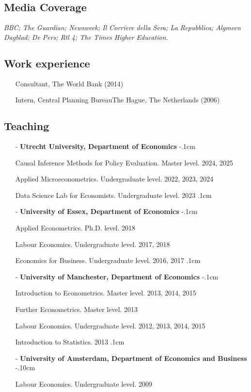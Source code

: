 \documentclass[11pt]{article}
\begin{document}
\subsection*{\sc Media Coverage}
{\emph{BBC; The Guardian; Newsweek; Il Corriere della Sera; La Repubblica; Algmeen Dagblad; De Pers; Rtl 4; The Times Higher Education}.

\subsection*{\sc Work experience}
\begin{itemize}[leftmargin=20pt]
    \itemsep-.1cm
    \item[] Consultant, The World Bank (2014)
    \item[] Intern, Central Planning Bureau\textendash The Hague, The Netherlands (2006)
\end{itemize}

\subsection*{\sc Teaching}
\begin{itemize}[leftmargin=20pt]
    \itemsep0cm
    \item[-]\textbf{Utrecht University, Department of Economics}
    \itemsep-.1cm
    \item[] Causal Inference Methods for Policy Evaluation. Master level. 2024, 2025
    \item[] Applied Microeconometrics. Undergraduate level. 2022, 2023, 2024
    \item[] Data Science Lab for Economists. Undergraduate level. 2023 
    \itemsep.1cm
    \item[-]\textbf{University of Essex, Department of Economics}
    \itemsep-.1cm
    \item[] Applied Econometrics. Ph.D. level. 2018
    \item[] Labour Economics. Undergraduate level. 2017, 2018
    \item[] Economics for Business. Undergraduate level. 2016, 2017
    \itemsep.1cm
    \item[-]\textbf{University of Manchester, Department of Economics}
    \itemsep-.1cm
    \item[] Introduction to Econometrics. Master level. 2013, 2014, 2015
    \item[] Further Econometrics. Master level. 2013
    \item[] Labour Economics. Undergraduate level. 2012, 2013, 2014, 2015
    \item[] Introduction to Statistics. 2013
    \itemsep.1cm
    \item[-]\textbf{University of Amsterdam, Department of Economics and Business}
    \itemsep-.10cm
    \item[] Labour Economics. Undergraduate level. 2009


\end{itemize}}
\end{document}
